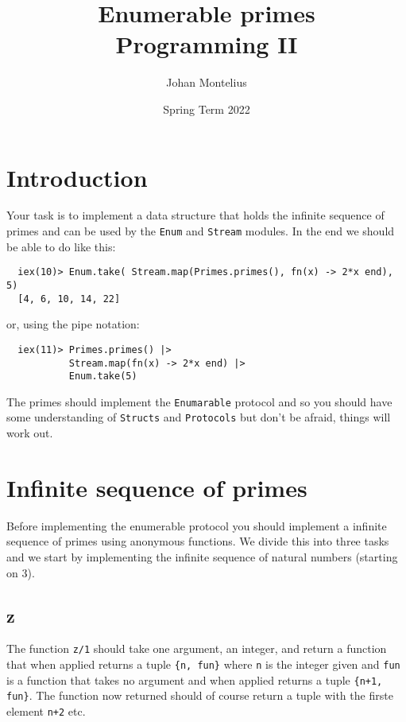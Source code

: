 \documentclass[a4paper,11pt]{article}
\begin{document}
\title{
    \textbf{Enumerable primes}\\
    \large{Programming II}
}
\author{Johan Montelius}
\date{Spring Term 2022}
\maketitle
{}

\section*{Introduction}

Your task is to implement a data structure that holds the infinite
sequence of primes and can be used by the {\tt Enum} and {\tt Stream}
modules. In the end we should be able to do like this:

\begin{verbatim}
  iex(10)> Enum.take( Stream.map(Primes.primes(), fn(x) -> 2*x end), 5)
  [4, 6, 10, 14, 22]
\end{verbatim}

or, using the pipe notation:

\begin{verbatim}
  iex(11)> Primes.primes() |>
           Stream.map(fn(x) -> 2*x end) |>
           Enum.take(5)
\end{verbatim}


The primes should implement the {\tt Enumarable} protocol and so you
should have some understanding of {\tt Structs} and {\tt Protocols} but
don't be afraid, things will work out.

\section*{Infinite sequence of primes}

Before implementing the enumerable protocol you should implement a
infinite sequence of primes using anonymous functions. We divide this
into three tasks and we start by implementing the infinite sequence of
natural numbers (starting on 3).

\subsection*{z}

The function {\tt z/1} should take one argument, an integer, and
return a function that when applied returns a tuple {\tt \{n, fun\}}
where {\tt n} is the integer given and {\tt fun} is a function that
takes no argument and when applied returns a tuple {\tt\{n+1,
  fun\}}. The function now returned should of course return a tuple
with the firste element {\tt n+2} etc.
\end{document}
